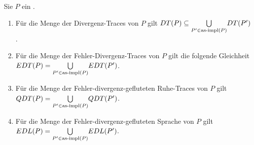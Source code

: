 \vspace{0.2cm}

\begin{Prop}
  \label{DivSemProp}
  Sie $P$ ein \MEIO{}.
  \begin{enumerate}
    \item Für die Menge der Divergenz-Traces von $P$ gilt $DT (P) \subseteq
      \underset{P'\in\mathrm{as}\text{-}\mathrm{impl} (P)}{\bigcup} DT (P')$.
    \item Für die Menge der Fehler-Divergenz-Traces von $P$ gilt die folgende
      Gleichheit $EDT (P) = \underset{P'\in\mathrm{as}\text{-}\mathrm{impl} (P)}{\bigcup} EDT (P')$.
    \item Für die Menge der Fehler-divergenz-gefluteten Ruhe-Traces von $P$
      gilt $QDT (P) = \underset{P'\in\mathrm{as}\text{-}\mathrm{impl} (P)}{\bigcup} QDT (P')$.
    \item Für die Menge der Fehler-divergenz-gefluteten Sprache von $P$ gilt
      $EDL (P) = \underset{P'\in\mathrm{as}\text{-}\mathrm{impl} (P)}{\bigcup} EDL (P')$.
  \end{enumerate}
\end{Prop}
